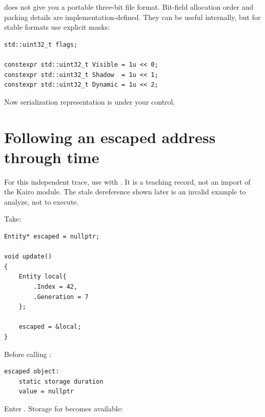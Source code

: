 does not give you a portable three-bit file format. Bit-field allocation order and packing details are implementation-defined. They can be useful internally, but for stable formats use explicit masks:

\begin{verbatim}
std::uint32_t flags;

constexpr std::uint32_t Visible = 1u << 0;
constexpr std::uint32_t Shadow  = 1u << 1;
constexpr std::uint32_t Dynamic = 1u << 2;
\end{verbatim}

Now serialization representation is under your control.

\section{Following an escaped address through time}\label{05-engine-i-ch003-following-an-escaped-address-through-time}

\hypertarget{05-engine-i-ch003-following-an-escaped-address-through-time}{}

For this independent trace, use  with . It is a teaching record, not an import of the Kairo module. The stale dereference shown later is an invalid example to analyze, not to execute.

Take:

\begin{verbatim}
Entity* escaped = nullptr;

void update()
{
    Entity local{
        .Index = 42,
        .Generation = 7
    };

    escaped = &local;
}
\end{verbatim}

Before calling :

\begin{verbatim}
escaped object:
    static storage duration
    value = nullptr
\end{verbatim}

Enter . Storage for  becomes available:

